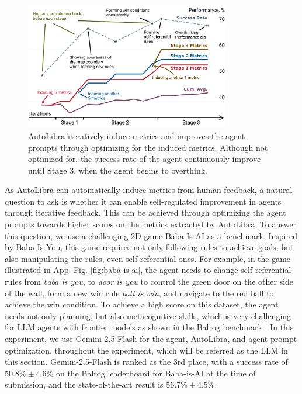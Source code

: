 
\begin{figure}[!t]
\centering
	\vspace{-20pt}
	\includegraphics[width=0.8\textwidth]{figs/running_maximum_plot.pdf}
	\vspace{-15pt}
	\caption{AutoLibra iteratively induce metrics and improves the agent prompts through optimizing for the induced metrics. Although not optimized for, the success rate of the agent continuously improve until Stage 3, when the agent begins to overthink.}
	\label{fig:autolibra_self_improving}
\end{figure}


As AutoLibra can automatically induce metrics from human feedback, a natural
question to ask is whether it can enable self-regulated improvement in agents
through iterative feedback.
This can be achieved through optimizing the agent
prompts towards higher scores on the metrics extracted by AutoLibra. 
To answer this question, we use a challenging 2D game Baba-Is-AI  \citep{cloos2024babaaibreakrules, paglieri2024balrog}
as a benchmark.
Inspired by \href{https://hempuli.com/baba/}{Baba-Is-You}, this game requires not only following rules to 
achieve goals, but also manipulating the rules, 
even self-referential ones. 
For example, in the game illustrated in App. Fig. \ref{fig:baba-is-ai}, the agent needs to change self-referential rules from \textsl{baba is you}, to \textsl{door is you} to control the green door on the other side of the wall, form a new win rule \textsl{ball is win}, and navigate to the red ball to achieve the win condition.
To achieve a high score on this dataset, the agent needs not only planning, but also metacognitive skills, which is very challenging for LLM agents with frontier models as shown in the Balrog benchmark \citep{paglieri2024balrog}. In this experiment, we use Gemini-2.5-Flash \citep{geminiteam2025geminifamilyhighlycapable} for the agent, AutoLibra, and agent prompt optimization, throughout the experiment, which will be referred as the LLM in this section. Gemini-2.5-Flash is ranked as the 3rd place, with a success rate of $50.8\%\pm 4.6\%$ on the Balrog leaderboard for Baba-is-AI at the time of submission, and the state-of-the-art result is $56.7\%\pm4.5\%$.

